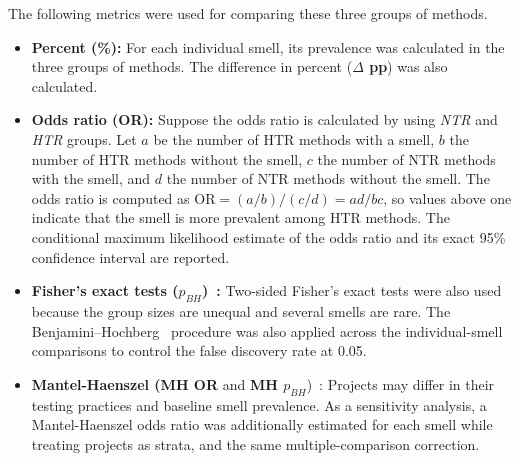 The following metrics were used for comparing these three groups of methods.
\begin{itemize}
    \item \textbf{Percent (\%):} For each individual smell, its prevalence was calculated in the three groups of methods. The difference in percent (\textbf{$\Delta$ pp}) was also calculated.
    \item \textbf{Odds ratio (OR):} Suppose the odds ratio is calculated by using \emph{NTR} and \emph{HTR} groups. Let $a$ be the number of HTR methods with a smell, $b$ the
number of HTR methods without the smell, $c$ the number of NTR methods with the
smell, and $d$ the number of NTR methods without the smell. The odds ratio is
computed as $\mathrm{OR} = (a/b)/(c/d) = ad/bc$, so values above one indicate
that the smell is more prevalent among HTR methods. The conditional
maximum likelihood estimate of the odds ratio and its exact 95\% confidence
interval are reported.
\item  \textbf{Fisher's
exact tests ($p_{BH}$)~\cite{fisher1922interpretation}:} Two-sided Fisher's
exact tests were also used because the group sizes are unequal and several smells are rare. The
Benjamini--Hochberg~\cite{benjamini1995controlling} procedure was also applied across the individual-smell comparisons to
control the false discovery rate at 0.05.
\item \textbf{Mantel-Haenszel (\textbf{MH OR}} and \textbf{MH $p_{BH}$})~\cite{mantel1959statistical}: Projects may differ in their testing practices and baseline smell prevalence.
As a sensitivity analysis, a Mantel-Haenszel odds
ratio was additionally estimated for each smell while treating projects as strata, and the same
multiple-comparison correction.


\end{itemize}


